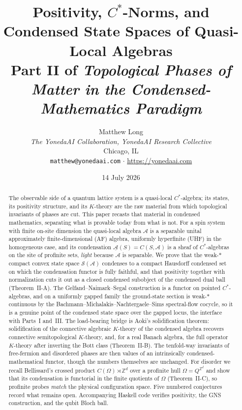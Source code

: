\documentclass[12pt]{article}
\title{\bfseries Positivity, $C^{*}$-Norms, and Condensed State Spaces of
Quasi-Local Algebras\\[0.4em]
\large Part II of \emph{Topological Phases of Matter in the
Condensed-Mathematics Paradigm}}
\author{Matthew Long \\
\textit{The YonedaAI Collaboration, YonedaAI Research Collective} \\
Chicago, IL \\
\texttt{matthew@yonedaai.com} $\cdot$ \url{https://yonedaai.com}}
\date{14 July 2026}
\newcommand{\cond}[1]{\underline{#1}}          %
\newcommand{\dis}{\Omega}                       %
\newcommand{\qla}{\mathcal{A}}                  %
\newcommand{\St}{\mathcal{S}}                   %
\newcommand{\ZZ}{\mathbb{Z}}
\theoremstyle{plain}
\begin{document}
\maketitle

\begin{abstract}
The observable side of a quantum lattice system is a quasi-local $C^{*}$-algebra;
its states, its positivity structure, and its $K$-theory are the raw material from
which topological invariants of phases are cut. This paper recasts that material in
condensed mathematics, separating what is provable today from what is not. For a spin
system with finite on-site dimension the
quasi-local algebra $\qla$ is a separable unital approximately finite-dimensional
(AF) algebra, uniformly hyperfinite (UHF) in the homogeneous case, and its
condensation $\cond{\qla}(S)=C(S,\qla)$ is a sheaf of $C^{*}$-algebras on the site
of profinite sets, \emph{light} because $\qla$ is separable. We prove that the
weak-$\ast$ compact convex state space $\St(\qla)$ condenses to a compact Hausdorff
condensed set on which the condensation functor is fully faithful, and that
positivity together with normalization cuts it out as a closed condensed subobject
of the condensed dual ball (Theorem~II-A). The Gelfand--Naimark--Segal construction
is a functor on pointed $C^{*}$-algebras, and on a uniformly gapped family the
ground-state section is weak-$\ast$ continuous by the
Bachmann--Michalakis--Nachtergaele--Sims spectral-flow cocycle, so it is a genuine
point of the condensed state space over the gapped locus, the interface with
Parts~I and~III. The load-bearing bridge is Aoki's solidification theorem:
solidification of the connective algebraic $K$-theory of the condensed algebra
recovers connective semitopological $K$-theory, and, for a real Banach algebra, the
full operator $K$-theory after inverting the Bott class (Theorem~II-B). The
tenfold-way invariants of free-fermion and disordered phases are then values of an
intrinsically condensed-mathematical functor, though the numbers themselves are
unchanged. For disorder we recall Bellissard's
crossed product $C(\dis)\rtimes\ZZ^{d}$ over a profinite hull $\dis=Q^{\ZZ^{d}}$ and
show that its condensation is functorial in the finite quotients of $\dis$
(Theorem~II-C), so profinite probes \emph{match} the physical configuration space.
Five numbered conjectures record what remains open. Accompanying Haskell code
verifies positivity, the GNS construction, and the qubit Bloch ball.
\end{abstract}

\tableofcontents
\end{document}
